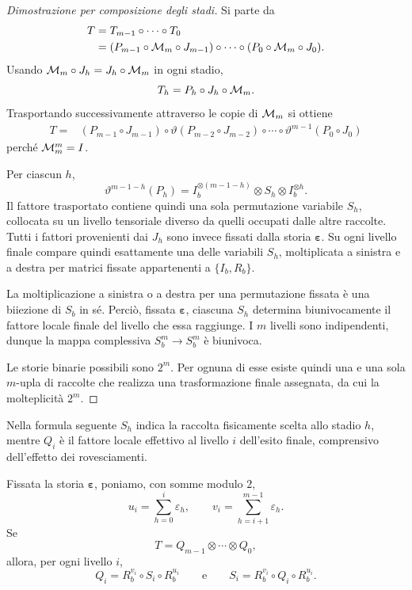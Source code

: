 	\begin{proof}[Dimostrazione per composizione degli stadi]
		Si parte da
		\[
		\begin{aligned}
		T
		&=
		T_{m-1}\circ\cdots\circ T_0\\
		&= (P_{m-1}\circ\mathcal M_m\circ J_{m-1})
		\circ\cdots\circ
		(P_0\circ\mathcal M_m\circ J_0).
		\end{aligned}
		\]
		Usando \(\mathcal M_m\circ J_h=J_h\circ\mathcal M_m\) in ogni stadio,
		\[
		T_h
		=
		P_h\circ J_h\circ\mathcal M_m.
		\]
		Trasportando successivamente attraverso le copie di \(\mathcal M_m\) si ottiene
		\[
		\begin{aligned}
		T
		={}&
		(P_{m-1}\circ J_{m-1})
		\circ
		\vartheta(P_{m-2}\circ J_{m-2})
		\circ \cdots \circ\vartheta^{m-1}(P_0\circ J_0)
		\end{aligned}
		\]
		perché \(\mathcal M_m^m=I\).

		Per ciascun \(h\),
		\[
				\vartheta^{m-1-h}(P_h)
		=
		I_b^{\otimes(m-1-h)}
		\otimes S_h\otimes
		I_b^{\otimes h}.
		\]
		Il fattore trasportato contiene quindi una sola permutazione variabile
		\(S_h\), collocata su un livello tensoriale diverso da quelli occupati
		dalle altre raccolte. Tutti i fattori provenienti dai \(J_h\) sono invece
		fissati dalla storia \(\boldsymbol{\varepsilon}\).
		Su ogni livello finale compare quindi esattamente una delle variabili
		\(S_h\), moltiplicata a sinistra e a destra per matrici fissate appartenenti
		a \(\{I_b,R_b\}\).

		La moltiplicazione a sinistra o a destra per una permutazione fissata è
		una biiezione di \(S_b\) in sé. Perciò, fissata
		\(\boldsymbol{\varepsilon}\), ciascuna \(S_h\) determina
		biunivocamente il fattore locale finale del livello che essa raggiunge.
		I \(m\) livelli sono indipendenti, dunque la mappa complessiva
		\(S_b^m\to S_b^m\) è biunivoca.

		Le storie binarie possibili sono \(2^m\). Per ognuna di esse esiste
		quindi una e una sola \(m\)-upla di raccolte che realizza una
		trasformazione finale assegnata, da cui la molteplicità \(2^m\).
	\end{proof}

	Nella formula seguente \(S_h\) indica la raccolta fisicamente scelta allo
	stadio \(h\), mentre \(Q_i\) è il fattore locale effettivo al livello
	\(i\) dell'esito finale, comprensivo dell'effetto dei rovesciamenti.

	\begin{corollary}
		\label{cor:formula-inversione-raccolte}
		Fissata la storia \(\boldsymbol{\varepsilon}\), poniamo, con somme
		modulo \(2\),
		\[
		u_i
		=
		\sum_{h=0}^{i}\varepsilon_h,
		\qquad
		v_i
		=
		\sum_{h=i+1}^{m-1}\varepsilon_h.
		\]
		Se
		\[
		T=Q_{m-1}\otimes\cdots\otimes Q_0,
		\]
		allora, per ogni livello \(i\),
		\[
		\boxed{
		Q_i
		=
		R_b^{v_i}\circ S_i\circ R_b^{u_i}
		}
		\qquad\text{e}\qquad
		\boxed{
		S_i
		=
		R_b^{v_i}\circ Q_i\circ R_b^{u_i}.
		}
		\]
	\end{corollary}

